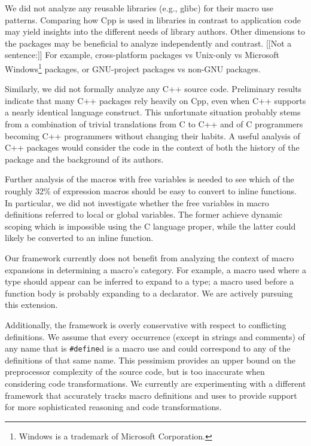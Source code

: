 \documentclass[10pt]{article}
\newcommand{\pkg}[1]{\textsf{#1}}
\newcommand{\vs}{vs}
\begin{document}
We did not analyze any reusable libraries (e.g., \pkg{glibc}) for their
macro use patterns.  Comparing how Cpp is used in libraries in contrast
to application code may yield insights into the different needs of
library authors.  Other dimensions to the packages may be beneficial to
analyze independently and contrast.  [[Not a sentence:]]  For example, cross-platform
packages \vs{} Unix-only \vs{} Microsoft Windows\footnote{Windows is a
  trademark of Microsoft Corporation.} packages, or GNU-project packages
\vs{} non-GNU packages.

Similarly, we did not formally analyze any C++ source code.  Preliminary
results indicate that many C++ packages rely heavily on Cpp, even when
C++ supports a nearly identical language construct.  This unfortunate
situation probably stems from a combination of trivial translations from
C to C++ and of C programmers becoming C++ programmers without changing
their habits.  A useful analysis of C++ packages would consider the code
in the context of both the history of the package and the background of
its authors.

Further analysis of the macros with free variables is needed to see
which of the roughly 32\% of expression macros should be easy to convert
to inline functions.  In particular, we did not investigate whether the
free variables in macro definitions referred to local or global
variables.  The former achieve dynamic scoping which is impossible using
the C language proper, while the latter could likely be converted to an
inline function.

Our framework currently does not benefit from analyzing the context of
macro expansions in determining a macro's category.  For example, a
macro used where a type should appear can be inferred to expand to a
type; a macro used before a function body is probably expanding to a
declarator.  We are actively pursuing this extension.

Additionally, the framework is overly conservative with respect to
conflicting definitions.  We assume that every occurrence (except in
strings and comments) of any name that is \texttt{\#define}d is a macro
use and could correspond to any of the definitions of that same name.
This pessimism provides an upper bound on the preprocessor complexity of
the source code, but is too inaccurate when considering code
transformations.  We currently are experimenting with a different
framework that accurately tracks macro definitions and uses to provide
support for more sophisticated reasoning and code transformations.
\end{document}
